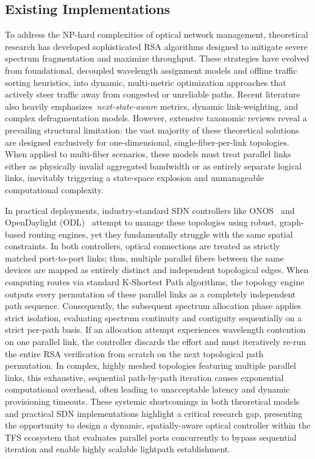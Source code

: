 \documentclass[12pt, a4paper, twoside, openright]{report}
\begin{document}
\subsection{Existing Implementations}
To address the NP-hard complexities of optical network management, theoretical research has developed sophisticated RSA algorithms designed to mitigate severe spectrum fragmentation and maximize throughput. These strategies have evolved from foundational, decoupled wavelength assignment models and offline traffic sorting heuristics, into dynamic, multi-metric optimization approaches that actively steer traffic away from congested or unreliable paths. Recent literature also heavily emphasizes~\emph{next-state-aware} metrics, dynamic link-weighting, and complex defragmentation models. However, extensive taxonomic reviews reveal a prevailing structural limitation: the vast majority of these theoretical solutions are designed exclusively for one-dimensional, single-fiber-per-link topologies. When applied to multi-fiber scenarios, these models must treat parallel links either as physically invalid aggregated bandwidth or as entirely separate logical links, inevitably triggering a state-space explosion and unmanageable computational complexity.

In practical deployments, industry-standard SDN controllers like ONOS~\cite{odtnONOS} and OpenDaylight (ODL)~\cite{odlTPCE} attempt to manage these topologies using robust, graph-based routing engines, yet they fundamentally struggle with the same spatial constraints. In both controllers, optical connections are treated as strictly matched port-to-port links; thus, multiple parallel fibers between the same devices are mapped as entirely distinct and independent topological edges. When computing routes via standard K-Shortest Path algorithms, the topology engine outputs every permutation of these parallel links as a completely independent path sequence. Consequently, the subsequent spectrum allocation phase applies strict isolation, evaluating spectrum continuity and contiguity sequentially on a strict per-path basis. If an allocation attempt experiences wavelength contention on one parallel link, the controller discards the effort and must iteratively re-run the entire RSA verification from scratch on the next topological path permutation. In complex, highly meshed topologies featuring multiple parallel links, this exhaustive, sequential path-by-path iteration causes exponential computational overhead, often leading to unacceptable latency and dynamic provisioning timeouts. These systemic shortcomings in both theoretical models and practical SDN implementations highlight a critical research gap, presenting the opportunity to design a dynamic, spatially-aware optical controller within the TFS ecosystem that evaluates parallel ports concurrently to bypass sequential iteration and enable highly scalable lightpath establishment.
\end{document}
